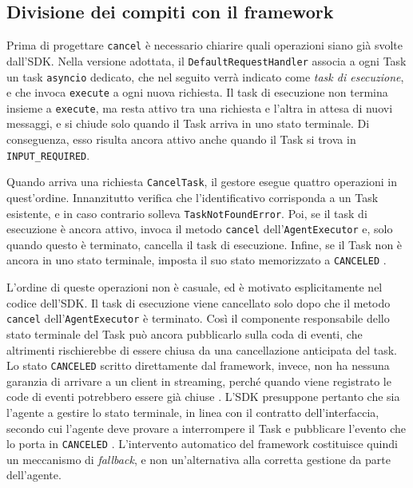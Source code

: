 \subsection{Divisione dei compiti con il framework}

Prima di progettare \texttt{cancel} è necessario chiarire quali operazioni siano già svolte dall'SDK. Nella versione adottata, il \texttt{DefaultRequestHandler} associa a ogni Task un task \texttt{asyncio} dedicato, che nel seguito verrà indicato come \emph{task di esecuzione}, e che invoca \texttt{execute} a ogni nuova richiesta. Il task di esecuzione non termina insieme a \texttt{execute}, ma resta attivo tra una richiesta e l'altra in attesa di nuovi messaggi, e si chiude solo quando il Task arriva in uno stato terminale. Di conseguenza, esso risulta ancora attivo anche quando il Task si trova in \texttt{INPUT\_REQUIRED}.

Quando arriva una richiesta \texttt{CancelTask}, il gestore esegue quattro operazioni in quest'ordine. Innanzitutto verifica che l'identificativo corrisponda a un Task esistente, e in caso contrario solleva \texttt{TaskNotFoundError}. Poi, se il task di esecuzione è ancora attivo, invoca il metodo \texttt{cancel} dell'\texttt{AgentExecutor} e, solo quando questo è terminato, cancella il task di esecuzione. Infine, se il Task non è ancora in uno stato terminale, imposta il suo stato memorizzato a \texttt{CANCELED} \cite{a2apythonsdk}.

L'ordine di queste operazioni non è casuale, ed è motivato esplicitamente nel codice dell'SDK. Il task di esecuzione viene cancellato solo dopo che il metodo \texttt{cancel} dell'\texttt{AgentExecutor} è terminato. Così il componente responsabile dello stato terminale del Task può ancora pubblicarlo sulla coda di eventi, che altrimenti rischierebbe di essere chiusa da una cancellazione anticipata del task. Lo stato \texttt{CANCELED} scritto direttamente dal framework, invece, non ha nessuna garanzia di arrivare a un client in streaming, perché quando viene registrato le code di eventi potrebbero essere già chiuse \cite{a2apythonsdk}. L'SDK presuppone pertanto che sia l'agente a gestire lo stato terminale, in linea con il contratto dell'interfaccia, secondo cui l'agente deve provare a interrompere il Task e pubblicare l'evento che lo porta in \texttt{CANCELED} \cite{a2apythondocs}. L'intervento automatico del framework costituisce quindi un meccanismo di \emph{fallback}, e non un'alternativa alla corretta gestione da parte dell'agente.

